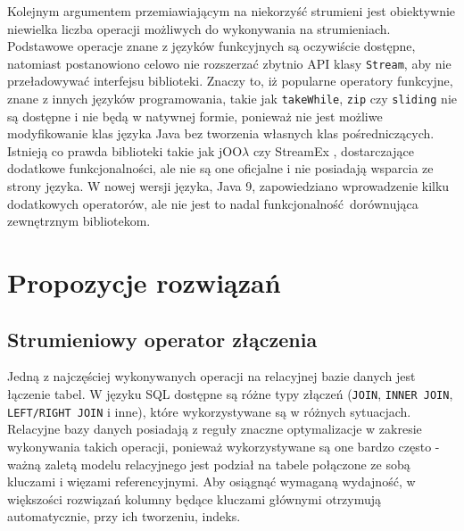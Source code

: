 \documentclass[12pt]{extarticle}
\begin{document}
    Kolejnym argumentem przemiawiającym na niekorzyść strumieni jest obiektywnie niewielka liczba operacji możliwych do wykonywania na strumieniach. Podstawowe operacje znane z języków funkcyjnych są oczywiście dostępne, natomiast postanowiono celowo nie rozszerzać zbytnio API klasy \texttt{Stream}, aby nie przeładowywać interfejsu biblioteki. Znaczy to, iż popularne operatory funkcyjne, znane z innych języków programowania, takie jak \texttt{takeWhile}, \texttt{zip} czy \texttt{sliding} nie są dostępne i nie będą w natywnej formie, ponieważ nie jest możliwe modyfikowanie klas języka Java bez tworzenia własnych klas pośredniczących. Istnieją co prawda biblioteki takie jak jOO$\lambda$ \cite{joolambda} czy StreamEx \cite{streamex}, dostarczające dodatkowe funkcjonalności, ale nie są one oficjalne i nie posiadają wsparcia ze strony języka. W nowej wersji języka, Java 9, zapowiedziano wprowadzenie kilku dodatkowych operatorów, ale nie jest to nadal funkcjonalność dorównująca zewnętrznym bibliotekom.


\section{Propozycje rozwiązań}

\subsection{Strumieniowy operator złączenia} \label{proposal}

    Jedną z najczęściej wykonywanych operacji na relacyjnej bazie danych jest łączenie tabel. W języku SQL dostępne są różne typy złączeń (\texttt{JOIN}, \texttt{INNER JOIN}, \texttt{LEFT/RIGHT JOIN} i inne), które wykorzystywane są w różnych sytuacjach. Relacyjne bazy danych posiadają z reguły znaczne optymalizacje w zakresie wykonywania takich operacji, ponieważ wykorzystywane są one bardzo często - ważną zaletą modelu relacyjnego jest podział na tabele połączone ze sobą kluczami i więzami referencyjnymi. Aby osiągnąć wymaganą wydajność, w większości rozwiązań kolumny będące kluczami głównymi otrzymują automatycznie, przy ich tworzeniu, indeks.
\end{document}
